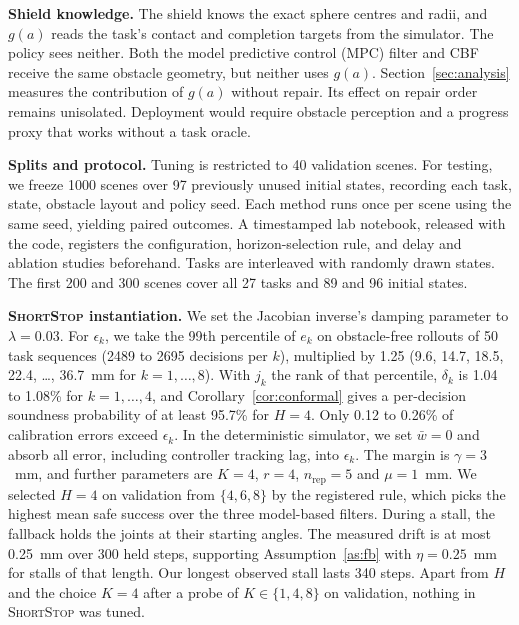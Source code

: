 \documentclass[runningheads]{llncs}
\newcommand{\sys}{\textsc{ShortStop}}
\begin{document}
\textbf{Shield knowledge.} The shield knows the exact sphere centres and
radii, and $g(a)$ reads the task's contact and completion targets from the
simulator. The policy sees neither. Both the model predictive control (MPC) filter
and CBF receive the same obstacle geometry, but neither uses $g(a)$.
Section~\ref{sec:analysis} measures the contribution of $g(a)$ without
repair. Its effect on repair order remains unisolated. Deployment would
require obstacle perception and a progress proxy that works without a task oracle.

\textbf{Splits and protocol.} Tuning is restricted to 40 validation scenes.
For testing, we freeze 1000 scenes over 97 previously unused initial
states, recording each task, state, obstacle layout and policy seed.
Each method runs once per scene using the same seed, yielding paired
outcomes. A timestamped lab notebook, released with the code, registers
the configuration, horizon-selection rule, and delay and ablation studies
beforehand. Tasks are interleaved with randomly drawn states. The first
200 and 300 scenes cover all 27 tasks and 89 and 96 initial states.

\textbf{\sys{} instantiation.} We set the Jacobian inverse's damping
parameter to $\lambda=0.03$. For $\epsilon_k$, we take the 99th
percentile of $e_k$ on obstacle-free rollouts of 50 task sequences (2489 to
2695 decisions per $k$), multiplied by 1.25 (9.6, 14.7, 18.5, 22.4, \dots,
36.7~mm for $k = 1,\dots,8$). With $j_k$ the rank of that percentile,
$\delta_k$ is 1.04 to 1.08\% for $k = 1,\dots,4$, and
Corollary~\ref{cor:conformal} gives a per-decision soundness probability of
at least 95.7\% for $H = 4$. Only 0.12 to 0.26\% of calibration errors exceed $\epsilon_k$.
In the deterministic simulator, we set $\bar w=0$ and absorb all error,
including controller tracking lag, into $\epsilon_k$. The margin is $\gamma = 3$~mm, and further
parameters are $K = 4$, $r = 4$, $n_{\mathrm{rep}} = 5$ and $\mu = 1$~mm. We
selected $H = 4$ on validation from $\{4, 6, 8\}$ by the
registered rule, which picks the highest mean safe success over the three
model-based filters. During a stall, the fallback holds the joints at their starting angles.
The measured drift is at most 0.25~mm over 300 held steps, supporting
Assumption~\ref{as:fb} with $\eta=0.25$~mm for stalls of that length.
Our longest observed stall lasts 340 steps. Apart from $H$
and the choice $K = 4$ after a probe of $K \in \{1, 4, 8\}$ on validation,
nothing in \sys{} was tuned.
\end{document}
